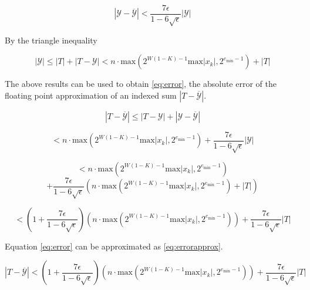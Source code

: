 \documentclass[12pt]{article}
\providecommand{\min}{\ensuremath{\text{min}}}
\providecommand{\max}{\ensuremath{\text{max}}}
\theoremstyle{definition}
\numberwithin{equation}{section}
\numberwithin{figure}{section}
\begin{document}
    \begin{equation*}
      |\mathcal{Y} - \overline{\mathcal{Y}}| < \frac{7\epsilon}{1 - 6\sqrt\epsilon}|\mathcal{Y}|
    \end{equation*}

    By the triangle inequality

    \begin{equation*}
      |\mathcal{Y}| \leq |T| + |T - \mathcal{Y}| < n \cdot \max(2^{W  (1 - K) - 1}  \max|x_k|, 2^{e_{\min} - 1}) + |T|
    \end{equation*}

    The above results can be used to obtain  \eqref{eq:error}, the absolute error of the floating point approximation of an indexed sum $|T - \overline{\mathcal{Y}}|$.

    \begin{equation*}
      |T - \overline{\mathcal{Y}}| \leq |T - \mathcal{Y}| + |\mathcal{Y} - \overline{\mathcal{Y}}|
    \end{equation*}

    \begin{equation*}
      < n \cdot \max(2^{W  (1 - K) - 1}  \max|x_k|, 2^{e_{\min} - 1}) + \frac{7\epsilon}{1 - 6\sqrt\epsilon} |\mathcal{Y}|
    \end{equation*}

    \begin{equation*}
      < n \cdot \max(2^{W  (1 - K) - 1}  \max|x_k|, 2^{e_{\min} - 1})
    \end{equation*}
    \begin{equation*}
      + \frac{7\epsilon}{1 - 6\sqrt\epsilon} (n \cdot \max(2^{W  (1 - K) - 1}  \max|x_k|, 2^{e_{\min} - 1}) + |T|)
    \end{equation*}

    \begin{equation}
      < (1 + \frac{7\epsilon}{1 - 6\sqrt\epsilon}) (n \cdot \max(2^{W (1 - K) - 1} \max|x_k|, 2^{e_{\min} - 1})) + \frac{7\epsilon}{1 - 6\sqrt\epsilon} |T|
      \label{eq:error}
    \end{equation}

    Equation \eqref{eq:error} can be approximated as \eqref{eq:errorapprox}.

    \begin{equation*}
      |T - \overline{\mathcal{Y}}| < (1 + \frac{7\epsilon}{1 - 6\sqrt\epsilon}) (n \cdot \max(2^{W (1 - K) - 1} \max|x_k|, 2^{e_{\min} - 1})) + \frac{7\epsilon}{1 - 6\sqrt\epsilon}|T|
    \end{equation*}
\end{document}
